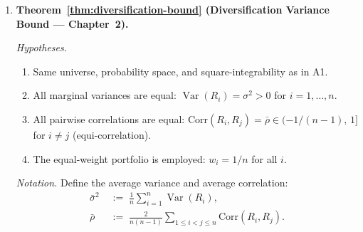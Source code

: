 \documentclass[12pt,openany]{book}
\newcommand{\bfSigma}{\boldsymbol{\Sigma}}
\DeclareMathOperator{\Var}{Var}
\numberwithin{equation}{chapter}
\theoremstyle{plain}
\theoremstyle{definition}
\theoremstyle{remark}
\def\bfSigma{Sigma}%
\begin{document}
\begin{enumerate}[label=\textbf{A\arabic*.}, leftmargin=*, widest=A2,
                  itemsep=6pt, parsep=2pt]
        \emph{Dependencies.} Definition~\ref{def:universe};
        positive semi-definiteness of $\bfSigma$; first-order
        Karush--Kuhn--Tucker conditions for quadratic programmes.

  \item \textbf{Theorem~\ref{thm:diversification-bound}
        (Diversification Variance Bound — Chapter~2).}

        \emph{Hypotheses.}
        \begin{enumerate}[label=(\roman*), itemsep=2pt]
          \item Same universe, probability space, and
                square-integrability as in A1.
          \item All marginal variances are equal:
                $\Var(R_i) = \sigma^2 > 0$ for $i=1,\ldots,n$.
          \item All pairwise correlations are equal:
                $\mathrm{Corr}(R_i,R_j) = \bar{\rho} \in (-1/(n-1),\,1]$
                for $i \neq j$ (equi-correlation).
          \item The equal-weight portfolio is employed:
                $w_i = 1/n$ for all $i$.
        \end{enumerate}

        \emph{Notation.}  Define the average variance and average
        correlation:
        \begin{align}
          \bar{\sigma}^2
            &\;:=\; \frac{1}{n}\sum_{i=1}^n \Var(R_i),
          \label{eq:sum-avg-var} \\[4pt]
          \bar{\rho}
            &\;:=\;
              \frac{2}{n(n-1)}
              \sum_{1 \leq i < j \leq n}
              \mathrm{Corr}(R_i,R_j).
          \label{eq:sum-avg-rho}
        \end{align}


\end{enumerate}
\end{document}
